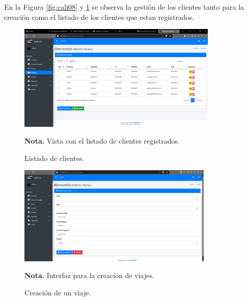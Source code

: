 En la Figura \ref{fig:cali08} y \ref{fig:cali09} se observa la gestión de los clientes tanto para la creación como el listado de los clientes que estan registrados.
 
 \begin{figure}[!h] %
 	\caption[Listado de clientes]
 	{\newline Listado de clientes.} %
 	\centering
 	\includegraphics[width=0.85\textwidth]{imagenes/cap_3/Img_calibus/CALIBUS112.png} %
 	
 	\begin{flushleft}
 		\hspace{1.20cm} \textbf{Nota.} Vista con el listado de clientes registrados. %
 	\end{flushleft}
 	\vspace{-16pt}
 	\label{fig:cali09} %
 \end{figure}
 
 \vspace{0.6cm} %
  
 \begin{figure}[!h] %
 	\caption[Creación de un viaje]
 	{\newline Creación de un viaje.} %
 	\centering
 	\includegraphics[width=0.83\textwidth]{imagenes/cap_3/Img_calibus/CALIBUS1112.png} %
 	
 	\begin{flushleft}
 		\hspace{1.20cm} \textbf{Nota.} Interfaz para la creación de viajes. %
 	\end{flushleft}
 	\vspace{-16pt}
 	\label{fig:cali23} %
 \end{figure}
 
